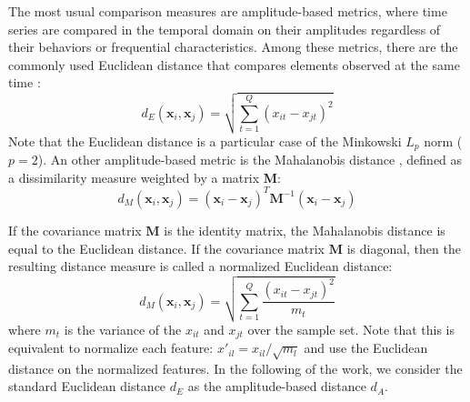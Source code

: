 The most usual comparison measures are amplitude-based metrics, where time series are compared in the temporal domain on their amplitudes regardless of their behaviors or frequential characteristics. Among these metrics, there are the commonly used Euclidean distance that compares elements observed at the same time \cite{Ding2008}: 
\begin{equation}	
	d_E(\textbf{x}_i,\textbf{x}_j) = \sqrt{\sum\limits_{t=1}^{Q} (x_{it}-x_{jt})^2}
\label{eq:A}
\end{equation}
Note that the Euclidean distance is a particular case of the Minkowski $L_p$ norm ($p=2$). An other amplitude-based metric is the Mahalanobis distance \cite{Prekopcsak2012}, defined as a dissimilarity measure weighted by a matrix \textbf{M}:
\begin{equation}	
	d_M(\textbf{x}_i,\textbf{x}_j) = (\textbf{x}_i-\textbf{x}_j)^T\textbf{M}^{-1}(\textbf{x}_i-\textbf{x}_j)
	\label{eq:dM}
\end{equation}

If the covariance matrix $\textbf{M}$ is the identity matrix, the Mahalanobis distance is equal to the Euclidean distance. If the covariance matrix $\textbf{M}$ is diagonal, then the resulting distance measure is called a normalized Euclidean distance:
\begin{equation}	
d_M(\textbf{x}_i,\textbf{x}_j) = \sqrt{\sum\limits_{t=1}^{Q}\frac{(x_{it}-x_{jt})^2}{m_t}}
\label{eq:dM2}
\end{equation}
\noindent where $m_t$ is the variance of the $x_{it}$ and $x_{jt}$ over the sample set. Note that this is equivalent to normalize each feature: $x'_{il} = x_{il}/\sqrt{m_l}$ and use the Euclidean distance on the normalized features.
In the following of the work, we consider the standard Euclidean distance $d_E$ as the amplitude-based distance $d_A$.

